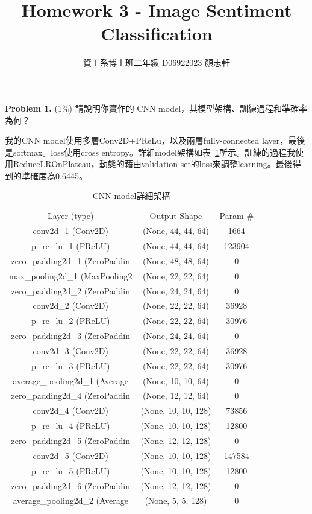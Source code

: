 \documentclass{article}
\title{Homework 3 - Image Sentiment Classification}
\author{資工系博士班二年級 D06922023 顏志軒}
\begin{document}
\maketitle

\textbf{Problem 1.} (1\%) 請說明你實作的 CNN model，其模型架構、訓練過程和準確率為何？

我的CNN model使用多層Conv2D+PReLu，以及兩層fully-connected layer，最後是softmax。loss使用cross entropy。詳細model架構如表~\ref{cnn_model}所示。訓練的過程我使用ReduceLROnPlateau，動態的藉由validation set的loss來調整learning。最後得到的準確度為0.6445。

\begin{table}
\caption{CNN model詳細架構}
\label{cnn_model}
\begin{tabular}{c|c|c}
Layer (type) &  Output Shape & Param \#\\
conv2d\_1 (Conv2D) & (None, 44, 44, 64) & 1664\\
p\_re\_lu\_1 (PReLU) & (None, 44, 44, 64) & 123904\\
zero\_padding2d\_1 (ZeroPaddin & (None, 48, 48, 64) & 0\\
max\_pooling2d\_1 (MaxPooling2 & (None, 22, 22, 64) & 0\\
zero\_padding2d\_2 (ZeroPaddin & (None, 24, 24, 64) & 0\\
conv2d\_2 (Conv2D) & (None, 22, 22, 64) & 36928\\
p\_re\_lu\_2 (PReLU) & (None, 22, 22, 64) & 30976\\
zero\_padding2d\_3 (ZeroPaddin & (None, 24, 24, 64) & 0\\
conv2d\_3 (Conv2D) & (None, 22, 22, 64) & 36928\\
p\_re\_lu\_3 (PReLU) & (None, 22, 22, 64) & 30976\\
average\_pooling2d\_1 (Average & (None, 10, 10, 64) & 0\\
zero\_padding2d\_4 (ZeroPaddin & (None, 12, 12, 64) & 0\\
conv2d\_4 (Conv2D) & (None, 10, 10, 128) &  73856\\
p\_re\_lu\_4 (PReLU) & (None, 10, 10, 128) &  12800\\
zero\_padding2d\_5 (ZeroPaddin & (None, 12, 12, 128) &  0\\
conv2d\_5 (Conv2D) & (None, 10, 10, 128) &  147584\\
p\_re\_lu\_5 (PReLU) & (None, 10, 10, 128) &  12800\\
zero\_padding2d\_6 (ZeroPaddin & (None, 12, 12, 128) &  0\\
average\_pooling2d\_2 (Average & (None, 5, 5, 128) &  0\\

\end{tabular}
\end{table}
\end{document}
